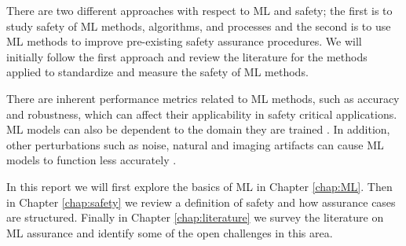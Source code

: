 There are two different approaches with respect to ML and safety; the first is to study safety of ML methods, algorithms, and processes and the second is to use ML methods to improve pre-existing safety assurance procedures.
We will initially follow the first approach and review the literature for the methods applied to standardize and measure the safety of ML methods.

There are inherent performance metrics related to ML methods, such as accuracy and robustness, which can affect their applicability in safety critical applications. ML models can also be dependent to the domain they are trained \cite{Ganin2015}. In addition, other perturbations such as noise, natural and imaging artifacts can cause ML models to function less accurately \cite{Hendrycks2019}.

In this report we will first explore the basics of ML in Chapter \ref{chap:ML}. Then in Chapter \ref{chap:safety} we review a definition of safety and how assurance cases are structured. Finally in Chapter \ref{chap:literature} we survey the literature on ML assurance and identify some of the open challenges in this area.